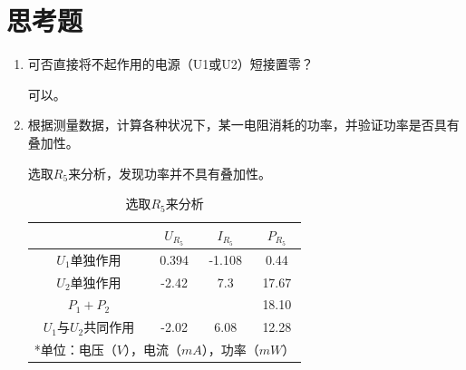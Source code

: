 \documentclass{../source/Experiment}
\begin{document}
    \section{思考题}
            \begin{enumerate}
                \item 可否直接将不起作用的电源（U1或U2）短接置零？ 
                \par 可以。
                \item 根据测量数据，计算各种状况下，某一电阻消耗的功率，并验证功率是否具有叠加性。 
                \par  选取$R_5$来分析，发现功率并不具有叠加性。
                \begin{table}[htbp]
                    \caption{选取$R_5$来分析}
                    \begin{center}
                        \begin{tabular}{|c|c|c|c|}
                            \hline
                            & $U_{R_5}$ & $I_{R_5}$ & $P_{R_5}$   \\ \hline
                            $U_1$单独作用       & 0.394    & -1.108   & 0.44  \\ \hline
                            $U_2$单独作用       & -2.42    & 7.3      & 17.67    \\ \hline
                            $P_1 + P_2$     &          &          & 18.10 \\ \hline
                            $U_1$与$U_2$共同作用 & -2.02    & 6.08     & 12.28 \\ \hline 
                            \multicolumn{4}{l}{*单位：电压（$V$），电流（$mA$），功率（$mW$）}
                        \end{tabular}
                    \end{center}
                \end{table}
            \end{enumerate}
\end{document}
